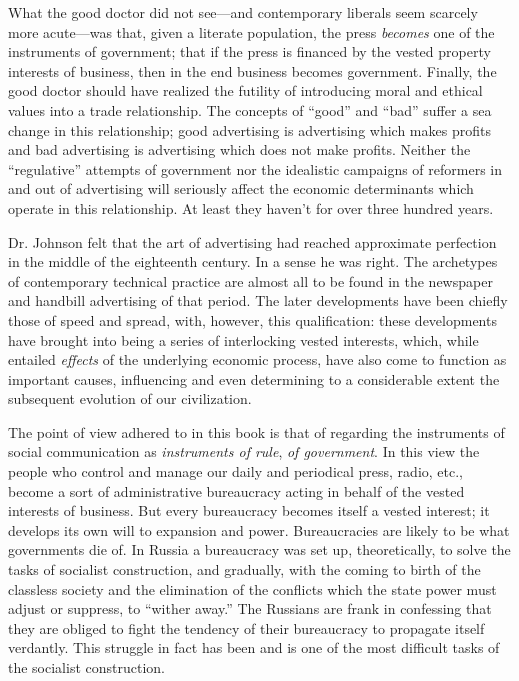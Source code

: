 \documentclass[nohyper,openany,nobib]{tufte-book}
\begin{document}
What the good doctor did not see---and contemporary liberals seem
scarcely more acute---was that, given a literate population, the press
\emph{becomes} one of the instruments of government; that if the press
is financed by the vested property interests of business, then in the
end business becomes government. Finally, the good doctor should have
realized the futility of introducing moral and ethical values into a
trade relationship. The concepts of ``good'' and ``bad'' suffer a sea
change in this relationship; good advertising is advertising which makes
profits and bad advertising is advertising which does not make profits.
Neither the ``regulative'' attempts of government nor the idealistic
campaigns of reformers in and out of advertising will seriously affect
the economic determinants which operate in this relationship. At least
they haven't for over three hundred years.

Dr. Johnson felt that the art of advertising had reached approximate
perfection in the middle of the eighteenth century. In a sense he was
right. The archetypes of contemporary technical practice are almost all
to be found in the newspaper and handbill advertising of that period.
The later developments have been chiefly those of speed and spread,
with, however, this qualification: these developments have brought into
being a series of interlocking vested interests, which, while entailed
\emph{effects} of the underlying economic process, have also come to
function as important causes, influencing and even determining to a
considerable extent the subsequent evolution of our civilization.

The point of view adhered to in this book is that of regarding the
instruments of social communication as \emph{instruments of rule},
\emph{of government}. In this view the people who control and manage our
daily and periodical press, radio, etc., become a sort of administrative
bureaucracy acting in behalf of the vested interests of business. But
every bureaucracy becomes itself a vested interest; it develops its own
will to expansion and power. Bureaucracies are likely to be what
governments die of. In Russia a bureaucracy was set up, theoretically,
to solve the tasks of socialist construction, and gradually, with the
coming to birth of the classless society and the elimination of the
conflicts which the state power must adjust or suppress, to ``wither
away.'' The Russians are frank in confessing that they are obliged to
fight the tendency of their bureaucracy to propagate itself verdantly.
This struggle in fact has been and is one of the most difficult tasks of
the socialist construction.
\end{document}
